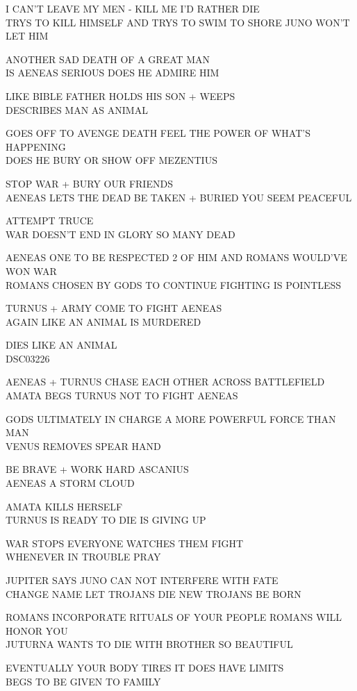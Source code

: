 \documentclass[10pt,letterpaper]{article}
\begin{document}
I CAN'T LEAVE MY MEN {-} KILL ME I'D RATHER DIE\\
TRYS TO KILL HIMSELF AND TRYS TO SWIM TO SHORE JUNO WON'T LET HIM

ANOTHER SAD DEATH OF A GREAT MAN\\
IS AENEAS SERIOUS DOES HE ADMIRE HIM

LIKE BIBLE FATHER HOLDS HIS SON + WEEPS\\
DESCRIBES MAN AS ANIMAL

GOES OFF TO AVENGE DEATH FEEL THE POWER OF WHAT'S HAPPENING\\
DOES HE BURY OR SHOW OFF MEZENTIUS

STOP WAR + BURY OUR FRIENDS\\
AENEAS LETS THE DEAD BE TAKEN + BURIED YOU SEEM PEACEFUL

ATTEMPT TRUCE\\
WAR DOESN'T END IN GLORY SO MANY DEAD

AENEAS ONE TO BE RESPECTED 2 OF HIM AND ROMANS WOULD'VE WON WAR\\
ROMANS CHOSEN BY GODS TO CONTINUE FIGHTING IS POINTLESS

TURNUS + ARMY COME TO FIGHT AENEAS\\
AGAIN LIKE AN ANIMAL IS MURDERED

DIES LIKE AN ANIMAL\\
DSC03226

AENEAS + TURNUS CHASE EACH OTHER ACROSS BATTLEFIELD\\
AMATA BEGS TURNUS NOT TO FIGHT AENEAS

GODS ULTIMATELY IN CHARGE A MORE POWERFUL FORCE THAN MAN\\
VENUS REMOVES SPEAR HAND

BE BRAVE + WORK HARD ASCANIUS\\
AENEAS A STORM CLOUD

AMATA KILLS HERSELF\\
TURNUS IS READY TO DIE IS GIVING UP

WAR STOPS EVERYONE WATCHES THEM FIGHT\\
WHENEVER IN TROUBLE PRAY

JUPITER SAYS JUNO CAN NOT INTERFERE WITH FATE\\
CHANGE NAME LET TROJANS DIE NEW TROJANS BE BORN

ROMANS INCORPORATE RITUALS OF YOUR PEOPLE ROMANS WILL HONOR YOU\\
JUTURNA WANTS TO DIE WITH BROTHER SO BEAUTIFUL

EVENTUALLY YOUR BODY TIRES IT DOES HAVE LIMITS\\
BEGS TO BE GIVEN TO FAMILY
\end{document}
